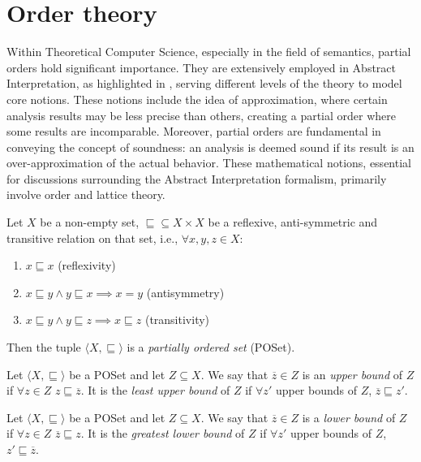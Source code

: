 \section{Order theory}\label{sec:ordertheory}

Within Theoretical Computer Science, especially in the field of
semantics, partial orders hold significant importance. They are
extensively employed in Abstract Interpretation, as highlighted in
\cite{mine:course}, serving different levels of the theory to model
core notions. These notions include the idea of approximation, where
certain analysis results may be less precise than others, creating a
partial order where some results are incomparable. Moreover, partial
orders are fundamental in conveying the concept of soundness: an
analysis is deemed sound if its result is an over-approximation of the
actual behavior. These mathematical notions, essential for discussions
surrounding the Abstract Interpretation formalism, primarily involve
order and lattice theory.

\begin{definition}
  Let \(X\) be a non-empty set, \(\sqsubseteq \subseteq X \times X\)
  be a reflexive, anti-symmetric and transitive relation on that set,
  i.e., \(\forall x,y,z \in X\):

  \begin{enumerate}
  \item \(x \sqsubseteq x\) (reflexivity)
  \item \(x \sqsubseteq y \wedge y \sqsubseteq x \implies x = y\)
    (antisymmetry)
  \item \(x \sqsubseteq y \wedge y \sqsubseteq z \implies x
    \sqsubseteq z\) (transitivity)
  \end{enumerate}

  Then the tuple \(\langle X, \sqsubseteq\rangle\) is a
  \emph{partially ordered set} (POSet).
\end{definition}

\begin{definition}
  Let \(\langle X, \sqsubseteq \rangle\) be a POSet and let
  \(Z \subseteq X\). We say that \(\overline{z} \in Z\) is an
  \emph{upper bound} of \(Z\) if \(\forall z \in Z\)
  \(z \sqsubseteq \overline{z}\). It is the \emph{least upper bound}
  of \(Z\) if \(\forall z'\) upper bounds of \(Z\),
  \(\overline{z} \sqsubseteq z'\).
\end{definition}

\begin{definition}
  Let \(\langle X, \sqsubseteq \rangle\) be a POSet and let
  \(Z \subseteq X\). We say that \(\overline{z}\in Z\) is a
  \emph{lower bound} of \(Z\) if \(\forall z \in Z\)
  \(\overline{z} \sqsubseteq z\). It is the \emph{greatest lower
    bound} of \(Z\) if \(\forall z'\) upper bounds of \(Z\),
  \(z' \sqsubseteq \overline{z}\).
\end{definition}

